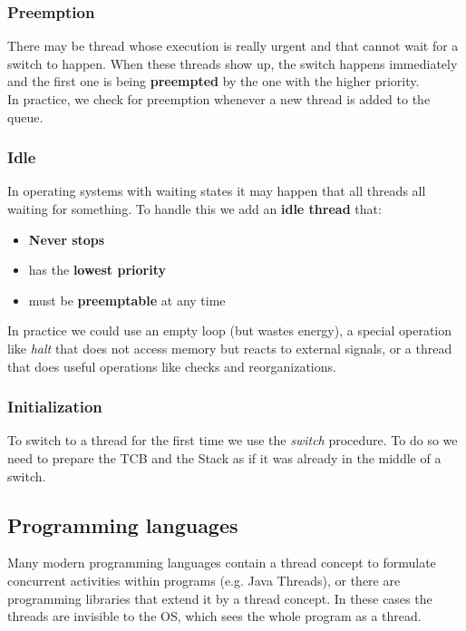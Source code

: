 \subsubsection{Preemption}
There may be thread whose execution is really urgent and that cannot wait for a switch to happen. When these threads show up, the switch happens immediately and the first one is being \textbf{preempted} by the one with the higher priority. \\
In practice, we check for preemption whenever a new thread is added to the queue.

\subsubsection{Idle}
In operating systems with waiting states it may happen that all threads all waiting for something. To handle this we add an \textbf{idle thread} that:
\begin{itemize}
	\item \textbf{Never stops}
	\item has the \textbf{lowest priority}
	\item must be \textbf{preemptable} at any time
\end{itemize}
In practice we could use an empty loop (but wastes energy), a special operation like \textit{halt} that does not access memory but reacts to external signals, or a thread that does useful operations like checks and reorganizations.

\subsubsection{Initialization}
To switch to a thread for the first time we use the \textit{switch} procedure. To do so we need to prepare the TCB and the Stack as if it was already in the middle of a switch.

\subsection{Programming languages}
Many modern programming languages contain a thread concept to formulate concurrent activities within programs (e.g. Java Threads), or there are programming libraries that extend it by a thread concept. In these cases the threads are invisible to the OS, which sees the whole program as a thread.